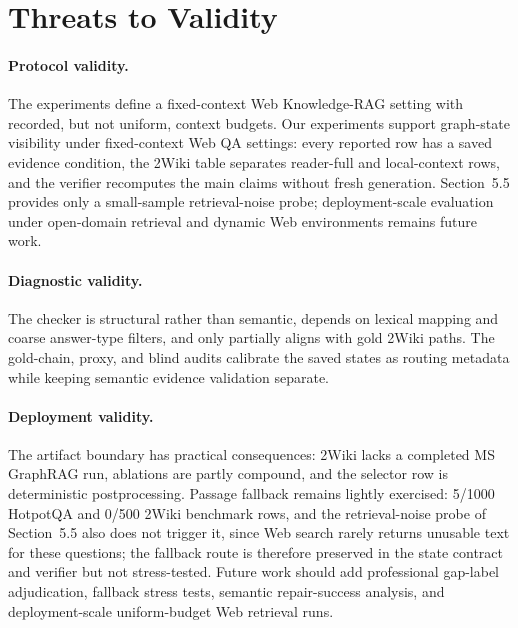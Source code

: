 \documentclass[runningheads,a4paper]{llncs}
\begin{document}
\section{Threats to Validity}
\label{sec:limitations}

\paragraph{Protocol validity.}
The experiments define a fixed-context Web Knowledge-RAG setting with recorded,
but not uniform, context budgets. Our experiments support graph-state visibility
under fixed-context Web QA settings: every reported row has a saved evidence
condition, the 2Wiki table separates reader-full and local-context rows, and the
verifier recomputes the main claims without fresh generation. Section~5.5 provides only a small-sample retrieval-noise probe; deployment-scale
evaluation under open-domain retrieval and dynamic Web environments remains
future work.

\paragraph{Diagnostic validity.}
The checker is structural rather than semantic, depends on lexical mapping and
coarse answer-type filters, and only partially aligns with gold 2Wiki paths. The
gold-chain, proxy, and blind audits calibrate the saved states as
routing metadata while keeping semantic evidence validation separate.

\paragraph{Deployment validity.}
The artifact boundary has practical consequences: 2Wiki lacks a completed MS
GraphRAG run, ablations are partly compound, and the selector row is
deterministic postprocessing. Passage fallback remains lightly exercised:
5/1000 HotpotQA and 0/500 2Wiki benchmark rows, and the retrieval-noise probe
of Section~5.5 also does not trigger it, since Web search rarely returns
unusable text for these questions; the fallback route is therefore preserved
in the state contract and verifier but not stress-tested. Future work should
add professional gap-label adjudication, fallback stress tests, semantic
repair-success analysis, and deployment-scale uniform-budget Web retrieval
runs.
\end{document}
